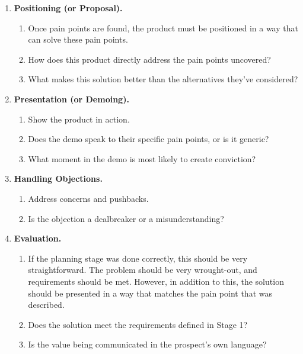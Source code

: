 \begin{enumerate}
    \item \textbf{Positioning (or Proposal).}
    \begin{enumerate}
        \item Once pain points are found, the product must be positioned in a way that
        can solve these pain points.
        \item How does this product directly address the pain points uncovered?
        \item What makes this solution better than the alternatives they've considered?
    \end{enumerate}

    \item \textbf{Presentation (or Demoing).}
    \begin{enumerate}
        \item Show the product in action.
        \item Does the demo speak to their specific pain points, or is it generic?
        \item What moment in the demo is most likely to create conviction?
    \end{enumerate}

    \item \textbf{Handling Objections.}
    \begin{enumerate}
        \item Address concerns and pushbacks.
        \item Is the objection a dealbreaker or a misunderstanding?
    \end{enumerate}

    \item \textbf{Evaluation.}
    \begin{enumerate}
        \item If the planning stage was done correctly, this should be very
        straightforward. The problem should be very wrought-out, and requirements should
        be met. However, in addition to this, the solution should be presented in a way
        that matches the pain point that was described.
        \item Does the solution meet the requirements defined in Stage 1?
        \item Is the value being communicated in the prospect's own language?
    \end{enumerate}


\end{enumerate}
